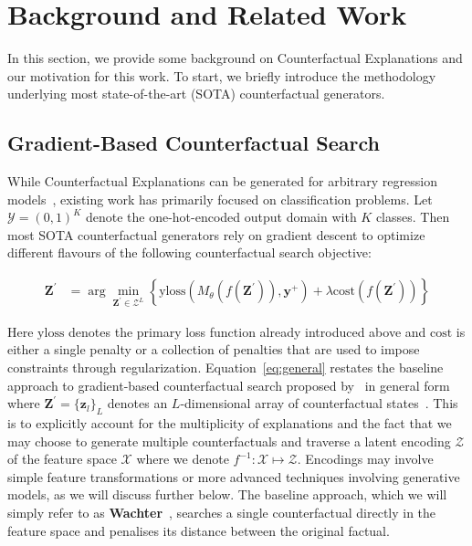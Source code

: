 \documentclass{article}
\begin{document}
\section{Background and Related Work}\label{background}

In this section, we provide some background on Counterfactual Explanations and our motivation for this work. To start, we briefly introduce the methodology underlying most state-of-the-art (SOTA) counterfactual generators.

\subsection{Gradient-Based Counterfactual Search}\label{gradient}

While Counterfactual Explanations can be generated for arbitrary regression models~\citep{spooner2021counterfactual}, existing work has primarily focused on classification problems. Let $\mathcal{Y}=(0,1)^K$ denote the one-hot-encoded output domain with $K$ classes. Then most SOTA counterfactual generators rely on gradient descent to optimize different flavours of the following counterfactual search objective:

\begin{equation} \label{eq:general}
\begin{aligned}
\mathbf{Z}^\prime &= \arg \min_{\mathbf{Z}^\prime \in \mathcal{Z}^L} \left\{  {\text{yloss}(M_{\theta}(f(\mathbf{Z}^\prime)),\mathbf{y}^+)}+ \lambda {\text{cost}(f(\mathbf{Z}^\prime)) }  \right\} 
\end{aligned} 
\end{equation}

Here $\text{yloss}$ denotes the primary loss function already introduced above and $\text{cost}$ is either a single penalty or a collection of penalties that are used to impose constraints through regularization. Equation~\ref{eq:general} restates the baseline approach to gradient-based counterfactual search proposed by~\citet{wachter2017counterfactual} in general form where $\mathbf{Z}^\prime=\{ \mathbf{z}_l\}_L$ denotes an $L$-dimensional array of counterfactual states~\citep{altmeyer2023endogenous}. This is to explicitly account for the multiplicity of explanations and the fact that we may choose to generate multiple counterfactuals and traverse a latent encoding $\mathcal{Z}$ of the feature space $\mathcal{X}$ where we denote $f^{-1}: \mathcal{X} \mapsto \mathcal{Z}$. Encodings may involve simple feature transformations or more advanced techniques involving generative models, as we will discuss further below. The baseline approach, which we will simply refer to as \textbf{Wachter}~\citep{wachter2017counterfactual}, searches a single counterfactual directly in the feature space and penalises its distance between the original factual. 
\end{document}
